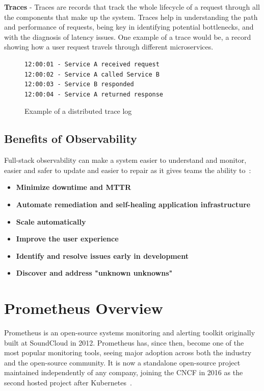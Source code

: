 \textbf{Traces} - Traces are records that track the whole lifecycle of a request through all the components that
make up
the system.
Traces help in understanding the path and performance of requests, being key in identifying potential bottlenecks,
and with the diagnosis of latency issues.
One example of a trace would be, a record showing how a user request travels through different microservices.\\
\begin{figure}[h]
    \centering
    \begin{lstlisting}
12:00:01 - Service A received request
12:00:02 - Service A called Service B
12:00:03 - Service B responded
12:00:04 - Service A returned response
    \end{lstlisting}
    \caption{Example of a distributed trace log}
\end{figure}


\subsection{Benefits of Observability}\label{subsec:benefits-of-observability}

Full-stack observability can make a system easier to understand and monitor, easier and safer to update and easier 
to repair as it gives teams the ability to~\cite{ibm_observability}:

\begin{itemize}
    \item   \textbf{Minimize downtime and \ac{MTTR}}
    \item   \textbf{Automate remediation and self-healing application infrastructure}
    \item   \textbf{Scale automatically}
    \item   \textbf{Improve the user experience}
    \item   \textbf{Identify and resolve issues early in development}
    \item   \textbf{Discover and address "unknown unknowns"}
\end{itemize}
\section{Prometheus Overview}\label{sec:prometheus-overview}
Prometheus is an open-source systems monitoring and alerting toolkit originally built at SoundCloud in 2012.
Prometheus has, since then, become one of the most popular monitoring tools, seeing major adoption across both the
industry and the open-source community.
It is now a standalone open-source project maintained independently of any company, joining the \ac{CNCF} in 2016 as
the second hosted project after Kubernetes~\cite{what_is_prometheus}.\\

